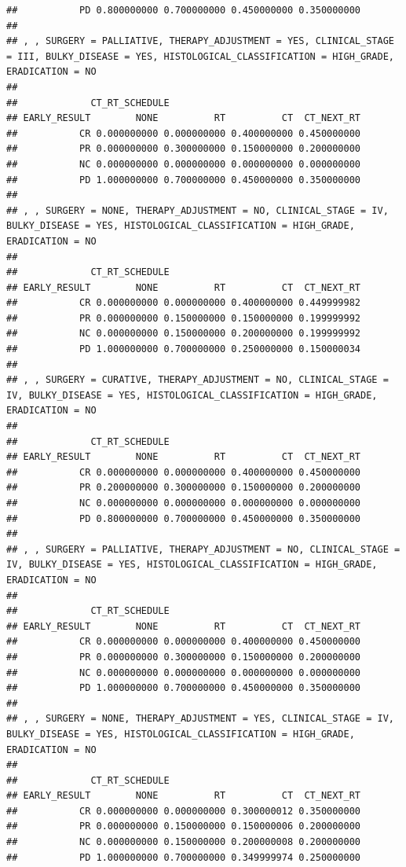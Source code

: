 \documentclass[]{article}
\begin{document}
\begin{verbatim}
##           PD 0.800000000 0.700000000 0.450000000 0.350000000
## 
## , , SURGERY = PALLIATIVE, THERAPY_ADJUSTMENT = YES, CLINICAL_STAGE = III, BULKY_DISEASE = YES, HISTOLOGICAL_CLASSIFICATION = HIGH_GRADE, ERADICATION = NO
## 
##             CT_RT_SCHEDULE
## EARLY_RESULT        NONE          RT          CT  CT_NEXT_RT
##           CR 0.000000000 0.000000000 0.400000000 0.450000000
##           PR 0.000000000 0.300000000 0.150000000 0.200000000
##           NC 0.000000000 0.000000000 0.000000000 0.000000000
##           PD 1.000000000 0.700000000 0.450000000 0.350000000
## 
## , , SURGERY = NONE, THERAPY_ADJUSTMENT = NO, CLINICAL_STAGE = IV, BULKY_DISEASE = YES, HISTOLOGICAL_CLASSIFICATION = HIGH_GRADE, ERADICATION = NO
## 
##             CT_RT_SCHEDULE
## EARLY_RESULT        NONE          RT          CT  CT_NEXT_RT
##           CR 0.000000000 0.000000000 0.400000000 0.449999982
##           PR 0.000000000 0.150000000 0.150000000 0.199999992
##           NC 0.000000000 0.150000000 0.200000000 0.199999992
##           PD 1.000000000 0.700000000 0.250000000 0.150000034
## 
## , , SURGERY = CURATIVE, THERAPY_ADJUSTMENT = NO, CLINICAL_STAGE = IV, BULKY_DISEASE = YES, HISTOLOGICAL_CLASSIFICATION = HIGH_GRADE, ERADICATION = NO
## 
##             CT_RT_SCHEDULE
## EARLY_RESULT        NONE          RT          CT  CT_NEXT_RT
##           CR 0.000000000 0.000000000 0.400000000 0.450000000
##           PR 0.200000000 0.300000000 0.150000000 0.200000000
##           NC 0.000000000 0.000000000 0.000000000 0.000000000
##           PD 0.800000000 0.700000000 0.450000000 0.350000000
## 
## , , SURGERY = PALLIATIVE, THERAPY_ADJUSTMENT = NO, CLINICAL_STAGE = IV, BULKY_DISEASE = YES, HISTOLOGICAL_CLASSIFICATION = HIGH_GRADE, ERADICATION = NO
## 
##             CT_RT_SCHEDULE
## EARLY_RESULT        NONE          RT          CT  CT_NEXT_RT
##           CR 0.000000000 0.000000000 0.400000000 0.450000000
##           PR 0.000000000 0.300000000 0.150000000 0.200000000
##           NC 0.000000000 0.000000000 0.000000000 0.000000000
##           PD 1.000000000 0.700000000 0.450000000 0.350000000
## 
## , , SURGERY = NONE, THERAPY_ADJUSTMENT = YES, CLINICAL_STAGE = IV, BULKY_DISEASE = YES, HISTOLOGICAL_CLASSIFICATION = HIGH_GRADE, ERADICATION = NO
## 
##             CT_RT_SCHEDULE
## EARLY_RESULT        NONE          RT          CT  CT_NEXT_RT
##           CR 0.000000000 0.000000000 0.300000012 0.350000000
##           PR 0.000000000 0.150000000 0.150000006 0.200000000
##           NC 0.000000000 0.150000000 0.200000008 0.200000000
##           PD 1.000000000 0.700000000 0.349999974 0.250000000

\end{verbatim}
\end{document}
